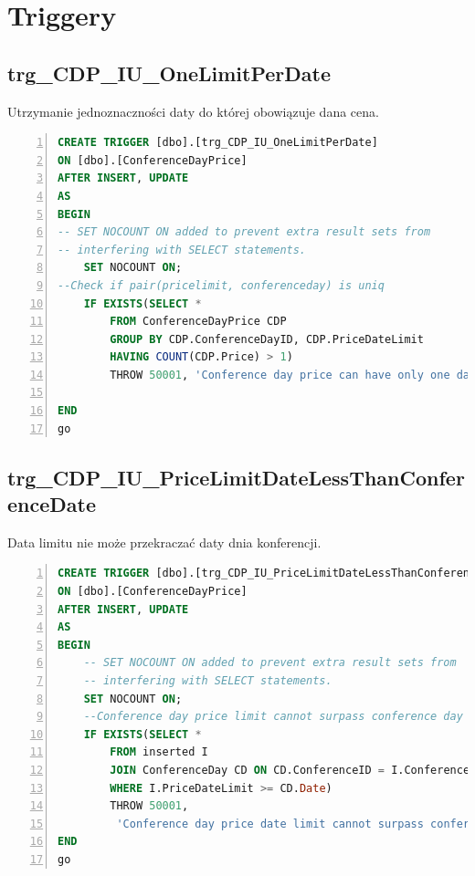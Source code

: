 \documentclass[]{article}
\begin{document}
	
\section{Triggery}

	\subsection{trg\_CDP\_IU\_OneLimitPerDate}
	Utrzymanie jednoznaczności daty do której obowiązuje dana cena.
\begin{lstlisting}[language=SQL,
showspaces=false,
basicstyle=\ttfamily,
numbers=left,
numberstyle=\tiny,
tabsize=2,
backgroundcolor=\color{lightg},
keywordstyle=\color{lightblue},
commentstyle=\color{gray}]
CREATE TRIGGER [dbo].[trg_CDP_IU_OneLimitPerDate]
ON [dbo].[ConferenceDayPrice]
AFTER INSERT, UPDATE
AS
BEGIN
-- SET NOCOUNT ON added to prevent extra result sets from
-- interfering with SELECT statements.
	SET NOCOUNT ON;
--Check if pair(pricelimit, conferenceday) is uniq
	IF EXISTS(SELECT *
		FROM ConferenceDayPrice CDP
		GROUP BY CDP.ConferenceDayID, CDP.PriceDateLimit       
		HAVING COUNT(CDP.Price) > 1)
		THROW 50001, 'Conference day price can have only one date.', 1

END
go

\end{lstlisting}

	\subsection{trg\_CDP\_IU\_PriceLimitDateLessThanConferenceDate}
	Data limitu nie może przekraczać daty dnia konferencji.
\begin{lstlisting}[language=SQL,
showspaces=false,
basicstyle=\ttfamily,
numbers=left,
numberstyle=\tiny,
tabsize=2,
backgroundcolor=\color{lightg},
keywordstyle=\color{lightblue},
commentstyle=\color{gray}]
CREATE TRIGGER [dbo].[trg_CDP_IU_PriceLimitDateLessThanConferenceDate]
ON [dbo].[ConferenceDayPrice]
AFTER INSERT, UPDATE
AS
BEGIN
	-- SET NOCOUNT ON added to prevent extra result sets from
	-- interfering with SELECT statements.
	SET NOCOUNT ON;
	--Conference day price limit cannot surpass conference day
	IF EXISTS(SELECT *
		FROM inserted I
		JOIN ConferenceDay CD ON CD.ConferenceID = I.ConferenceDayID
		WHERE I.PriceDateLimit >= CD.Date)
		THROW 50001,
		 'Conference day price date limit cannot surpass conference day date.', 1
END
go

\end{lstlisting}
\end{document}
